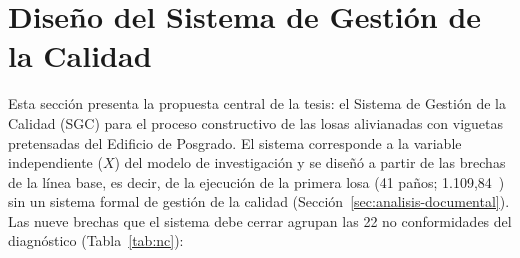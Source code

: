\section{Diseño del Sistema de Gestión de la Calidad}
\label{sec:diseno-sgc}

Esta sección presenta la propuesta central de la tesis: el Sistema de Gestión de la Calidad (SGC) para el proceso constructivo de las losas alivianadas con viguetas pretensadas del Edificio de Posgrado. El sistema corresponde a la variable independiente ($X$) del modelo de investigación y se diseñó a partir de las brechas de la línea base, es decir, de la ejecución de la primera losa (41 paños; 1.109,84~\mdos{}) sin un sistema formal de gestión de la calidad (Sección~\ref{sec:analisis-documental}). Las nueve brechas que el sistema debe cerrar agrupan las 22 no conformidades del diagnóstico (Tabla~\ref{tab:nc}):

